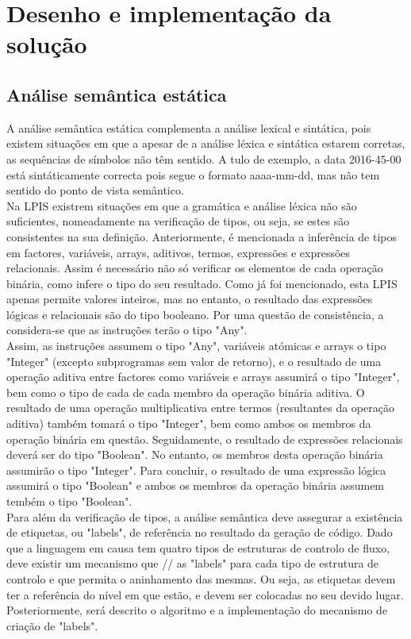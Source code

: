\chapter{Desenho e implementação da solução}
\label{cap:desenho}

\section{Análise semântica estática}
\label{sec:semantica:desenho}

A análise semântica estática complementa a análise lexical e sintática, pois existem 
situações em que a apesar de a análise léxica e sintática estarem corretas, as
sequências de símbolos não têm sentido. A tulo de exemplo, a data 2016-45-00 está
sintáticamente correcta pois segue o formato aaaa-mm-dd, mas não tem sentido do ponto
de vista semântico.\\

Na LPIS existrem situações em que a gramática e análise léxica não são suficientes, 
nomeadamente na verificação de tipos, ou seja, se estes são consistentes na sua definição.
Anteriormente, é mencionada a inferência de tipos em factores, variáveis, arrays, aditivos,
termos, expressões e expressões relacionais. Assim é necessário não só verificar os elementos
de cada operação binária, como infere o tipo do seu resultado. 
Como já foi mencionado, esta LPIS apenas permite valores inteiros, mas no entanto, o resultado
das expressões lógicas e relacionais são do tipo booleano. Por uma questão de consistência, a 
considera-se que as instruções terão o tipo "Any".\\

Assim, as instruções assumem o tipo "Any", variáveis atómicas e arrays o tipo "Integer" 
(excepto subprogramas sem valor de retorno), e o resultado de uma operação aditiva
entre factores como variáveis e arrays assumirá o tipo "Integer", bem como o tipo de cada
de cada membro da operação binária aditiva. O resultado de uma operação multiplicativa entre
termos (resultantes da operação aditiva) também tomará o tipo "Integer", bem como ambos
os membros da operação binária em questão. Seguidamente, o resultado de expressões relacionais
deverá ser do tipo "Boolean". No entanto, os membros desta operação binária assumirão o tipo
"Integer". Para concluir, o resultado de uma expressão lógica assumirá o tipo "Boolean" e 
ambos os membros da operação binária assumem tembém o tipo "Boolean".\\

Para além da verificação de tipos, a análise semântica deve assegurar a existência de etiquetas,
ou "labels", de referência no resultado da geração de código. Dado que a linguagem em causa tem
quatro tipos de estruturas de controlo de fluxo, deve existir um mecanismo que // as "labels" 
para cada tipo de estrutura de controlo e que permita o aninhamento das mesmas. Ou seja, as 
etiquetas devem ter a referência do nível em que estão, e devem ser colocadas no seu devido lugar.
Posteriormente, será descrito o algoritmo e a implementação do mecanismo de criação de "labels".\\

